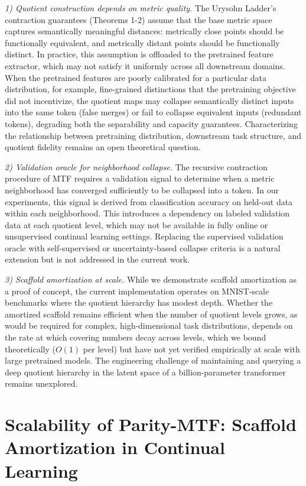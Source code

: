 \documentclass{article}
\begin{document}
\textit{1) Quotient construction depends on metric quality.}
The Urysohn Ladder's contraction guarantees (Theorems 1-2) assume that the base metric space captures semantically meaningful distances: metrically close points should be functionally equivalent, and metrically distant points should be functionally distinct.
In practice, this assumption is offloaded to the pretrained feature extractor, which may not satisfy it uniformly across all downstream domains.
When the pretrained features are poorly calibrated for a particular data distribution, for example, fine-grained distinctions that the pretraining objective did not incentivize, the quotient maps may collapse semantically distinct inputs into the same token (false merges) or fail to collapse equivalent inputs (redundant tokens), degrading both the separability and capacity guarantees.
Characterizing the relationship between pretraining distribution, downstream task structure, and quotient fidelity remains an open theoretical question.

\textit{2) Validation oracle for neighborhood collapse.}
The recursive contraction procedure of MTF requires a validation signal to determine when a metric neighborhood has converged sufficiently to be collapsed into a token.
In our experiments, this signal is derived from classification accuracy on held-out data within each neighborhood.
This introduces a dependency on labeled validation data at each quotient level, which may not be available in fully online or unsupervised continual learning settings.
Replacing the supervised validation oracle with self-supervised or uncertainty-based collapse criteria is a natural extension but is not addressed in the current work.

\textit{3) Scaffold amortization at scale.}
While we demonstrate scaffold amortization as a proof of concept, the current implementation operates on MNIST-scale benchmarks where the quotient hierarchy has modest depth.
Whether the amortized scaffold remains efficient when the number of quotient levels grows, as would be required for complex, high-dimensional task distributions, depends on the rate at which covering numbers decay across levels, which we bound theoretically ($O(1)$ per level) but have not yet verified empirically at scale with large pretrained models.
The engineering challenge of maintaining and querying a deep quotient hierarchy in the latent space of a billion-parameter transformer remains unexplored.


\section{Scalability of Parity-MTF: Scaffold Amortization in Continual Learning}
\label{sec:scalability_parity_mtf}
\end{document}
